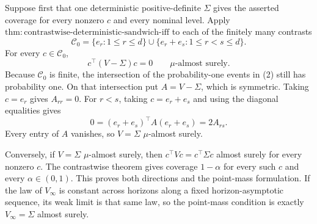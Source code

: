 Suppose first that one deterministic positive-definite \(\Sigma\) gives the asserted coverage for every nonzero \(c\) and every nominal level. Apply \(\mathrm{thm:contrastwise\text{-}deterministic\text{-}sandwich\text{-}iff}\) to each of the finitely many contrasts
\[
 \mathcal C_0=\{e_r:1\le r\le d\}\cup
 \{e_r+e_s:1\le r<s\le d\}.
\tag{1}
\]
For every \(c\in\mathcal C_0\),
\[
 c^\top(V-\Sigma)c=0\qquad\mu\text{-almost surely}.
\tag{2}
\]
Because \(\mathcal C_0\) is finite, the intersection of the probability-one events in (2) still has probability one. On that intersection put \(A=V-\Sigma\), which is symmetric. Taking \(c=e_r\) gives \(A_{rr}=0\). For \(r<s\), taking \(c=e_r+e_s\) and using the diagonal equalities gives
\[
 0=(e_r+e_s)^\top A(e_r+e_s)=2A_{rs}.
\tag{3}
\]
Every entry of \(A\) vanishes, so \(V=\Sigma\) \(\mu\)-almost surely.

Conversely, if \(V=\Sigma\) \(\mu\)-almost surely, then \(c^\top Vc=c^\top\Sigma c\) almost surely for every nonzero \(c\). The contrastwise theorem gives coverage \(1-\alpha\) for every such \(c\) and every \(\alpha\in(0,1)\). This proves both directions and the point-mass formulation. If the law of \(V_\infty\) is constant across horizons along a fixed horizon-asymptotic sequence, its weak limit is that same law, so the point-mass condition is exactly \(V_\infty=\Sigma\) almost surely.